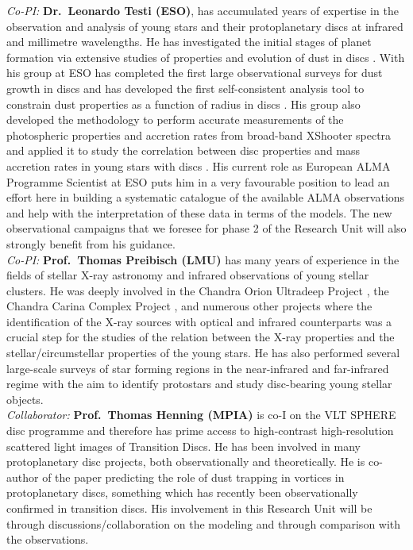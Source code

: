 \documentclass[10pt,fleqn,twoside]{article}
\begin{document}
{\it Co-PI:} {\bf Dr.\ Leonardo Testi (ESO)}, has accumulated years of expertise
in the observation and analysis of young stars and their protoplanetary
discs at infrared and millimetre wavelengths. He has investigated the initial stages of planet formation via
extensive studies of properties and evolution of dust in discs 
\citep{2003A&A...403..323T, 2014prpl.conf..339T}. 
With his group at ESO has completed the first large observational surveys for dust growth
in discs \citep{2010A&A...512A..15R, 2010A&A...521A..66R}
and has developed the first self-consistent analysis tool to constrain dust properties
as a function of radius in discs \citep{2011A&A...525A..12B, 2013A&A...558A..64T, 
2016A&A...588A..53T}.
His group also developed the methodology to perform accurate measurements of
the photospheric properties and accretion rates from broad-band XShooter
spectra \citep{2013A&A...551A.107M} and applied it to study the correlation
between disc properties and mass accretion rates in young stars with discs
\citep{2016A&A...591L...3M}.
His current role as European ALMA Programme Scientist at ESO
puts him in a very favourable position to lead an effort here in
building a systematic catalogue of the available ALMA observations and help with the interpretation of these data in terms of
the models. The new observational
campaigns that we foresee for phase 2 of the Research Unit will also
strongly 
benefit from his guidance. \\

{\it Co-PI:} {\bf Prof.\ Thomas Preibisch (LMU)}  has many years of experience in the
fields of stellar X-ray astronomy and infrared observations
of young stellar clusters.
He was deeply involved in the
Chandra Orion Ultradeep Project \citep[COUP, see][]{2005ApJS..160..401P},
the Chandra Carina Complex Project \citep[CCCP, see][]{2011ApJS..194...10P},
and numerous other projects where
the identification of the X-ray sources with optical
and infrared counterparts was a crucial step for the studies
of the relation between the X-ray properties and the stellar/circumstellar
properties of the young stars. He has also performed several large-scale 
surveys of star forming
regions in the near-infrared \citep[e.g.,][]{2011ApJS..194...10P,
2014A&A...572A.116P}
and far-infrared regime \citep[e.g.,][]{2012A&A...541A.132P}
with the aim to identify protostars and study disc-bearing young
stellar objects.\\

{\it Collaborator:} {\bf Prof.\ Thomas Henning (MPIA)}  is co-I
on the VLT SPHERE disc programme and therefore has prime access to
high-contrast high-resolution scattered light images of Transition
Discs. He has been involved in many protoplanetary disc projects, both
observationally and theoretically. He is co-author of the 
\citet{1997Icar..128..213K} paper predicting the role of dust trapping in vortices
in protoplanetary discs, something which has recently been 
observationally confirmed in transition discs. 
His involvement in this
Research Unit will be through discussions/collaboration on the
modeling and through comparison with the observations. \\
\end{document}
